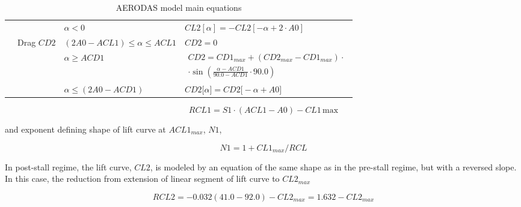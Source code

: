 \begin{table}[!htb]
\begin{tabular}{llll}
                                    & \multicolumn{1}{c}{}                            & $\alpha < 0$                                & $CL2[\alpha] = - CL2[-\alpha + 2 \cdot A0]$                                                                                 \\ \cline{2-4} 
                                    & \multirow{3}{*}{Drag $CD2$}                     & $(2A0-ACL1) \leq \alpha \leq ACL1$          & $CD2 = 0$                                                                                                                   \\
                                    &                                                 & $\alpha \geq ACD1$                          & $\begin{aligned}CD2 = CD1_{max}+\left( CD2_{max} - CD1_{max}\right) \cdot \\ \cdot \sin\left({\frac{\alpha-A C D1}{90.0-A C D1}} \cdot 90.0\right)\end{aligned}$ \\
                                    &                                                 & $\alpha \leq (2A0 - ACD1)$                  & $CD2\big[ \alpha \big] = CD2 \big[- \alpha + A0\big]$                                                                       \\ \hline
        \end{tabular}
    \caption{AERODAS model main equations \cite{spera_models_2008}}
    \label{tab:aerodas_key_equation}
\end{table}

\begin{equation}
    R C L1=S1\cdot(A C L1-A0)-C L1\,\mathrm{max}
\end{equation}

and exponent defining shape of lift curve at $ACL1_{max}$, $N1$,

\begin{equation}
    N1 = 1 + CL1_{max} / RCL
\end{equation}

In post-stall regime, the lift curve, $CL2$, is modeled by an equation of the same shape as in the pre-stall regime, but with a reversed slope. In this case, the reduction from extension of linear segment of lift curve to $CL2_{max}$

\begin{equation}
    RCL2 = -0.032 \left(41.0-92.0\right) - CL2_{max} = 1.632- CL2_{max}
\end{equation}

